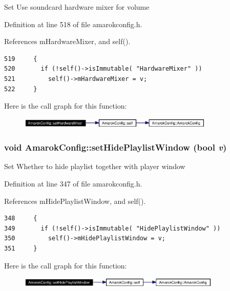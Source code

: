 Set Use soundcard hardware mixer for volume 

Definition at line 518 of file amarokconfig.h.

References m\-Hardware\-Mixer, and self().



\footnotesize\begin{verbatim}519     {
520       if (!self()->isImmutable( "HardwareMixer" ))
521         self()->mHardwareMixer = v;
522     }
\end{verbatim}\normalsize 


Here is the call graph for this function:\begin{figure}[H]
\begin{center}
\leavevmode
\includegraphics[width=264pt]{classAmarokConfig_AmarokConfige53_cgraph}
\end{center}
\end{figure}
\subsubsection{\setlength{\rightskip}{0pt plus 5cm}void Amarok\-Config::set\-Hide\-Playlist\-Window (bool {\em v})\hspace{0.3cm}{\tt  [inline, static]}}\label{classAmarokConfig_AmarokConfige35}


Set Whether to hide playlist together with player window 

Definition at line 347 of file amarokconfig.h.

References m\-Hide\-Playlist\-Window, and self().



\footnotesize\begin{verbatim}348     {
349       if (!self()->isImmutable( "HidePlaylistWindow" ))
350         self()->mHidePlaylistWindow = v;
351     }
\end{verbatim}\normalsize 


Here is the call graph for this function:\begin{figure}[H]
\begin{center}
\leavevmode
\includegraphics[width=274pt]{classAmarokConfig_AmarokConfige35_cgraph}
\end{center}
\end{figure}
